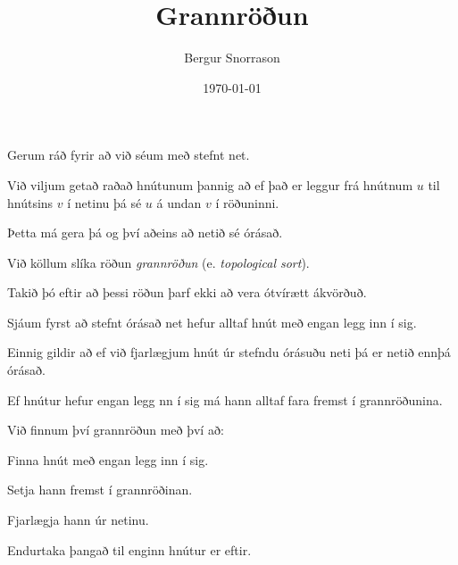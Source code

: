 \title{Grannröðun}
\author{Bergur Snorrason}
\date{\today}



\frame{\titlepage}

{
	{
		\item<1-> Gerum ráð fyrir að við séum með stefnt net.
		\item<2-> Við viljum getað raðað hnútunum þannig að ef það er leggur frá hnútnum $u$ til hnútsins $v$ í netinu þá sé $u$ á undan $v$ í röðuninni.
		\item<3-> Þetta má gera þá og því aðeins að netið sé órásað.
		\item<4-> Við köllum slíka röðun \emph{grannröðun} (e. \emph{topological sort}).
		\item<5-> Takið þó eftir að þessi röðun þarf ekki að vera ótvírætt ákvörðuð.
	}
}

{
	{
		\item<1-> Sjáum fyrst að stefnt órásað net hefur alltaf hnút með engan legg inn í sig.
		\item<2-> Einnig gildir að ef við fjarlægjum hnút úr stefndu órásuðu neti þá er netið ennþá órásað.
		\item<3-> Ef hnútur hefur engan legg nn í sig má hann alltaf fara fremst í grannröðunina.
		\item<4-> Við finnum því grannröðun með því að:
		{
			\item<5-> Finna hnút með engan legg inn í sig.
			\item<6-> Setja hann fremst í grannröðinan.
			\item<7-> Fjarlægja hann úr netinu.
			\item<8-> Endurtaka þangað til enginn hnútur er eftir.
		}
	}
}

